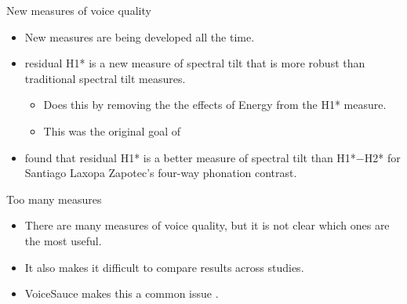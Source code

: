 \documentclass[professionalfont]{beamer}
\begin{document}
\begin{frame}{New measures of voice quality}
  \begin{itemize}
    \item New measures are being developed all the time.
    \item {} residual H1* is a new measure of spectral tilt that is more robust than traditional spectral tilt measures.
    \begin{itemize}
      \item Does this by removing the the effects of Energy from the H1* measure.
      \item This was the original goal of \citet{fischer-jorgensenPhoneticAnalysisBreathy1968}
    \end{itemize}
    \item \citet{brinkerhoffUsingResidualH12025} found that residual H1* is a better measure of spectral tilt than H1*$-$H2* for Santiago Laxopa Zapotec's four-way phonation contrast.
  \end{itemize}
\end{frame}

\begin{frame}{Too many measures}
  \begin{itemize}
    \item There are many measures of voice quality, but it is not clear which ones are the most useful.
    \item It also makes it difficult to compare results across studies.
    \item VoiceSauce makes this a common issue \citep{shueVoiceSauceProgramVoice2011}.
  \end{itemize}
\end{frame}
\end{document}
